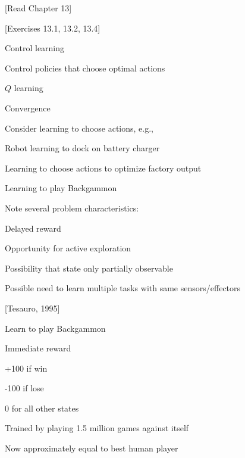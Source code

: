 
 \bk

\centerline{[Read Chapter 13]}

\centerline{[Exercises 13.1, 13.2, 13.4]}

\bi
\item Control learning
\item Control policies that choose optimal actions
\item $Q$ learning
\item Convergence
\ei

 \bk

Consider learning to choose actions, e.g.,

\bi
\item Robot learning to dock on battery charger
\item Learning to choose actions to optimize factory output
\item Learning to play Backgammon
\ei

Note several problem characteristics:
\bi
\item Delayed reward
\item Opportunity for active exploration
\item Possibility that state only partially observable
\item Possible need to learn multiple tasks with same sensors/effectors
\ei


 \bk

\centerline{[Tesauro, 1995]}

\bigskip

Learn to play Backgammon

\bigskip
Immediate reward
\bi
\item +100 if win
\item -100 if lose
\item 0 for all other states
\ei

\bigskip

Trained by playing 1.5 million games against itself

\bigskip
Now approximately equal to best human player

 \bk

\centerline{\hbox{}}



 \bk


